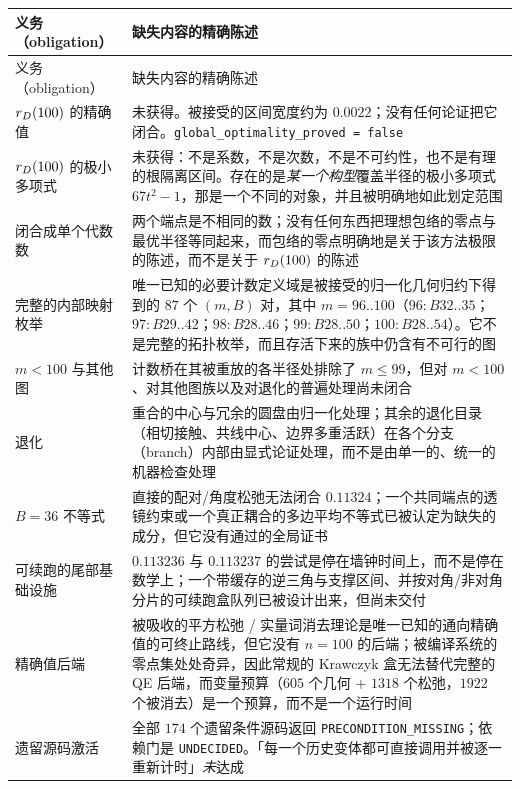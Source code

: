 {\footnotesize
\begin{longtable}{@{}>{\raggedright\arraybackslash}p{}>{\raggedright\arraybackslash}p{}@{}}
\toprule
义务（obligation） & 缺失内容的精确陈述 \\
\midrule
\endfirsthead
\toprule
义务（obligation） & 缺失内容的精确陈述 \\
\midrule
\endhead
\bottomrule
\endlastfoot
$r_{D}(100)$ 的精确值 & 未获得。被接受的区间宽度约为 $0.0022$；没有任何论证把它闭合。\texttt{global\_\allowbreak{}optimality\_\allowbreak{}proved = false} \\
$r_{D}(100)$ 的极小多项式 & 未获得：不是系数，不是次数，不是不可约性，也不是有理的根隔离区间。存在的是\emph{某一个构型}覆盖半径的极小多项式
$67t^2-1$，那是一个不同的对象，并且被明确地如此划定范围 \\
闭合成单个代数数 & 两个端点是不相同的数；没有任何东西把理想包络的零点与最优半径等同起来，而包络的零点明确地是关于该方法极限的陈述，而不是关于 $r_{D}(100)$ 的陈述 \\
完整的内部映射枚举 & 唯一已知的必要计数定义域是被接受的归一化几何归约下得到的 $87$ 个 $(m,B)$ 对，其中
$m=96..100$（$96:B32..35$；$97:B29..42$；$98:B28..46$；$99:B28..50$；$100:B28..54$）。它不是完整的拓扑枚举，而且存活下来的族中仍含有不可行的图 \\
$m<100$ 与其他图 & 计数桥在其被重放的各半径处排除了 $m\le99$，但对 $m<100$、对其他图族以及对退化的普遍处理尚未闭合 \\
退化 & 重合的中心与冗余的圆盘由归一化处理；其余的退化目录（相切接触、共线中心、边界多重活跃）在各个分支（branch）内部由显式论证处理，而不是由单一的、统一的机器检查处理 \\
$B=36$ 不等式 & 直接的配对/角度松弛无法闭合 $0.11324$；一个共同端点的透镜约束或一个真正耦合的多边平均不等式已被认定为缺失的成分，但它没有通过的全局证书 \\
可续跑的尾部基础设施 & $0.113236$ 与 $0.113237$ 的尝试是停在墙钟时间上，而不是停在数学上；一个带缓存的逆三角与支撑区间、并按对角/非对角分片的可续跑盒队列已被设计出来，但尚未交付 \\
精确值后端 & 被吸收的平方松弛 / 实量词消去理论是唯一已知的通向精确值的可终止路线，但它没有 $n=100$ 的后端；被编译系统的零点集处处奇异，因此常规的 Krawczyk 盒无法替代完整的 QE 后端，而变量预算（$605$ 个几何 $+$ $1318$ 个松弛，$1922$ 个被消去）是一个预算，而不是一个运行时间 \\
遗留源码激活 & 全部 $174$ 个遗留条件源码返回
\texttt{PRECONDITION\_\allowbreak{}MISSING}；依赖门是 \texttt{UNDECIDED}。「每一个历史变体都可直接调用并被逐一重新计时」\emph{未}达成 \\

\end{longtable}}
